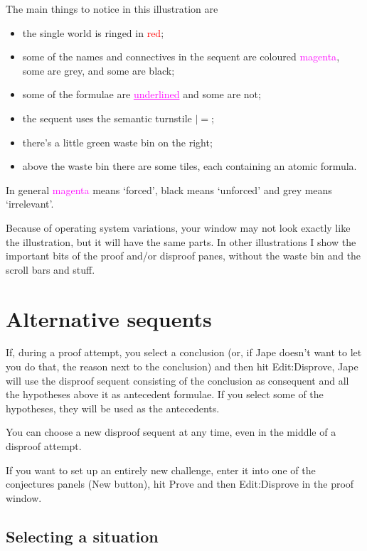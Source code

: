 \documentclass[11pt]{book}
\begin{document}
The main things to notice in this illustration are
\begin{itemize}
\item the single world is ringed in \textcolor{red}{red};
\item some of the names and connectives in the sequent are coloured \textcolor{magenta}{magenta}, some are \textcolor{halfgrey}{grey}, and some are black;
\item some of the formulae are \textcolor{magenta}{\underline{underlined}} and some are not;
\item the sequent uses the semantic turnstile $|=$; 
\item there's a little green waste bin on the right;
\item above the waste bin there are some tiles, each containing an atomic formula.
\end{itemize}

In general \textcolor{magenta}{magenta} means `forced', black means `unforced' and \textcolor{halfgrey}{grey} means `irrelevant'.

Because of operating system variations, your window may not look exactly like the illustration, but it will have the same parts. In other illustrations I show the important bits of the proof and/or disproof panes, without the waste bin and the scroll bars and stuff.

\section{Alternative sequents}

If, during a proof attempt, you select a conclusion (or, if Jape doesn't want to let you do that, the reason next to the conclusion) and then hit Edit:Disprove, Jape will use the disproof sequent consisting of the conclusion as consequent and all the hypotheses above it as antecedent formulae. If you select some of the hypotheses, they will be used as the antecedents.

You can choose a new disproof sequent at any time, even in the middle of a disproof attempt.

If you want to set up an entirely new challenge, enter it into one of the conjectures panels (New button), hit Prove and then Edit:Disprove in the proof window.

\subsection{Selecting a situation}
\end{document}
